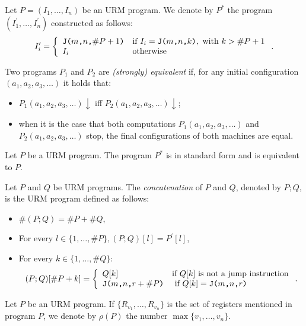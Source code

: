 \begin{definition}
	Let $P = (I_1, \ldots, I_n)$ be an URM program. We denote by $P^*$ the program $(I^\prime_1, \ldots, I^\prime_n)$ constructed as follows:
	\[
	I_i^\prime = 
		\left\{
	\begin{array}{ll}
		\texttt{J(} m\texttt{,} n \texttt{,} \#P+1 \texttt{)} & \mbox{if } I_i = \texttt{J(} m\texttt{,} n \texttt{,} k \texttt{)}, \text{ with } k > \#P+1 \\
		I_i & \mbox{otherwise} 
	\end{array}
	\right. .
	\]
\end{definition}

\begin{definition}
	Two programs $P_1$ and $P_2$ are \emph{(strongly) equivalent} if, for any initial configuration $(a_1, a_2, a_3, \ldots)$ it holds that:
	\begin{itemize}
		\item $P_1(a_1, a_2, a_3, \ldots) \downarrow$ iff $P_2(a_1, a_2, a_3, \ldots) \downarrow$;
		\item when it is the case that both computations $P_1(a_1, a_2, a_3, \ldots)$ and $P_2(a_1, a_2, a_3, \ldots)$ stop, the final configurations of both machines are equal. 
	\end{itemize}
\end{definition}

\begin{theorem}
	Let $P$ be a URM program. The program $P^*$ is in standard form and is equivalent to $P$. 
\end{theorem}

\begin{definition}
	Let $P$ and $Q$ be URM programs. The \emph{concatenation} of $P$ and $Q$, denoted by $P;Q$, is the URM program defined as follows:
	\begin{itemize}
		\item $\#(P;Q) = \# P + \# Q$,
		\item For every $l \in \{ 1 , \ldots, \# P \}, (P;Q)[l] = P^\prime[l]$,
		\item For every $k \in \{ 1 , \ldots, \# Q \}$:
			\[
				(P;Q)[\#P+k] = 
		\left\{
	\begin{array}{ll}
		Q[k] & \mbox{if }  Q[k] \text{ is not a jump instruction}\\
		\texttt{J(} m\texttt{,} n \texttt{,} r+ \#P \texttt{)} & \mbox{ if } Q[k] = \texttt{J(} m\texttt{,} n \texttt{,} r \texttt{)} 
	\end{array}
	\right. .
			\]
	\end{itemize}	
\end{definition}

\begin{definition}
	Let $P$ be an URM program. If $ \{ R_{v_1}, \ldots, R_{v_n} \} $ is the set of registers mentioned in program $P$, we denote by $\rho(P)$ the number $ \max \{ v_1, \ldots, v_n \} $. 
\end{definition}


